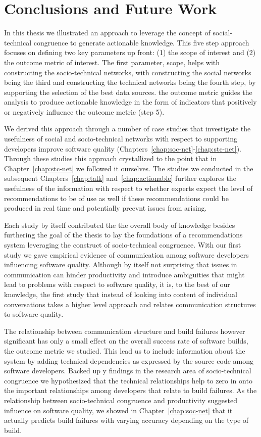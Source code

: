 \section{Conclusions and Future Work}
In this thesis we illustrated an approach to leverage the concept of social-technical congruence to generate actionable knowledge.
This five step approach focuses on defining two key parameters up front: (1) the scope of interest and (2) the outcome metric of interest.
The first parameter, scope, helps with constructing the socio-technical networks, with constructing the social networks being the third and constructing the technical networks being the fourth step, by supporting the selection of the best data sources.
the outcome metric guides the analysis to produce actionable knowledge in the form of indicators that positively or negatively influence the outcome metric (step 5). 

We derived this approach through a number of case studies that investigate the usefulness of social and socio-technical networks with respect to supporting developers improve software quality (Chapters~\ref{chap:soc-net}-\ref{chap:stc-net}).
Through these studies this approach crystallized to the point that in Chapter~\ref{chap:stc-net} we followed it ourselves.
The studies we conducted in the subsequent Chapters~\ref{chap:talk} and~\ref{chap:actionable} further explores the usefulness of the information with respect to whether experts expect the level of recommendations to be of use as well if these recommendations could be produced in real time and potentially preevnt issues from arising.

Each study by itself contributed the the overall body of knowledge besides furthering the goal of the thesis to lay the foundations of a recommendations system leveraging the construct of socio-technical congruence.
With our first study we gave empirical evidence of communication among software developers influencing software quality.
Although by itself not surprising that issues in communication can hinder productivity and introduce ambiguities that might lead to problems with respect to software quality, it is, to the best of our knowledge, the first study that instead of looking into content of individual  conversations takes a higher level approach and relates communication structures to software quality.

The relationship between communication structure and build failures however significant has only a small effect on the overall success rate of software builds, the outcome metric we studied.
This lead us to include information about the system by adding technical dependencies as expressed by the source code among software developers.
Backed up y findings in the research area of socio-technical congruence we hypothesized that the technical relationships help to zero in onto the important relationships among developers that relate to build failures.
As the relationship between socio-technical congruence and productivity suggested influence on software quality, we showed in Chapter~\ref{chap:soc-net} that it actually predicts build failures with varying accuracy depending on the type of build.

